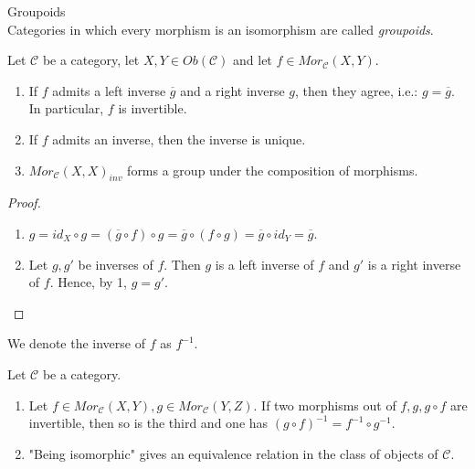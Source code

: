 \begin{definition}{Groupoids}\\
Categories in which every morphism is an isomorphism are called \textit{groupoids}.
\end{definition}

\begin{proposition}
    Let $\mathcal{C}$ be a category, let $X,Y \in Ob(\mathcal{C})$ and let $f \in Mor_\mathcal{C} (X,Y)$.
    \begin{enumerate}
        \item If $f$ admits a left inverse $\overline{g}$ and a right inverse $g$, then they agree, i.e.: $g = \overline{g}$. In particular, $f$ is invertible.
        \item If $f$ admits an inverse, then the inverse is unique.
        \item $Mor_\mathcal{C}(X,X)_{inv}$ forms a group under the composition of morphisms.
    \end{enumerate}
\end{proposition}

\begin{proof}
    \begin{enumerate}
        \item $g=id_X \circ g = (\overline{g} \circ f) \circ g = \overline{g} \circ (f \circ g) = \overline{g} \circ id_Y = \overline{g}$.
        \item Let $g,g'$ be inverses of $f$. Then $g$ is a left inverse of $f$ and $g'$ is a right inverse of $f$. Hence, by 1, $g=g'$.
    \end{enumerate}
\end{proof}

\begin{definition}
    We denote the inverse of $f$ as $f^{-1}$.
\end{definition}

\begin{proposition}
    Let $\mathcal{C}$ be a category.
    \begin{enumerate}
        \item Let $f \in Mor_\mathcal{C} (X,Y), g \in Mor_\mathcal{C} (Y,Z)$. If two morphisms out of $f,g,g \circ f$ are invertible, then so is the third and one has $(g \circ f)^{-1} = f^{-1} \circ g^{-1}$.
        \item "Being isomorphic" gives an equivalence relation in the class of objects of $\mathcal{C}$.
    \end{enumerate}
\end{proposition}

